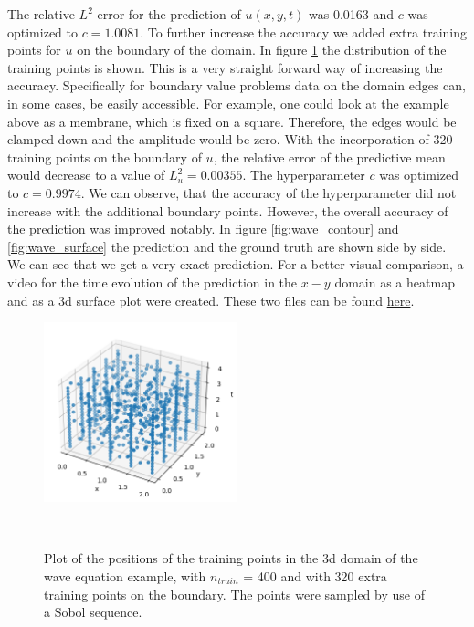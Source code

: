 \documentclass{article}
\begin{document}
The relative $L^2$ error for the prediction of $u(x,y,t)$ was 0.0163 and $c$ was optimized to $c = 1.0081$. To further increase the accuracy we added extra training points for $u$ on the boundary of the domain. In figure \ref{fig:training_points_wave} the distribution of the training points is shown. This is a very straight forward way of increasing the accuracy. Specifically for boundary value problems  data on the domain edges can, in some cases, be easily accessible. For example, one could look at the example above as a membrane, which is fixed on a square. Therefore, the edges would be clamped down and the amplitude would be zero. With the incorporation of 320 training points on the boundary of $u$, the relative error of the predictive mean would decrease to a value of $L^2_u = 0.00355$. The hyperparameter $c$ was optimized to $c = 0.9974$. We can observe, that the accuracy of the hyperparameter did not increase with the additional boundary points. However, the overall accuracy of the prediction was improved notably. In figure \ref{fig:wave_contour} and \ref{fig:wave_surface} the prediction and the ground truth are shown side by side. We can see that we get a very exact prediction. For a better visual comparison, a video for the time evolution of the prediction in the $x-y$ domain as a heatmap and as a 3d surface plot were created. These two files can be found \href{https://github.com/TobiLeitgeb/Code_bac/tree/main/final_examples/wave_equation/movie files}{here}.

\begin{figure}
    \centering
    \includegraphics[width=0.5\textwidth]{../final_examples/wave_equation/training_points.png}
    \caption{Plot of the positions of the training points in the 3d domain of the wave equation example, with $n_{train}$ = 400 and with 320 extra training points on the boundary. The points were sampled by use of a Sobol sequence.}
    ~\label{fig:training_points_wave}
\end{figure}
\end{document}

